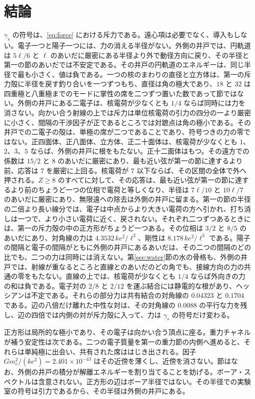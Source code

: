 \documentclass[a4paper]{article}
\begin{document}
\section{結論}

\(\gamma_s\) の符号は、\eqref{eq:force} における斥力である。遠心項は必要でなく、導入もしない。電子一つと陽子一つには、力の消える半径がない。外側の井戸では、円軌道は \(5\ell/6\) と \(\ell\) のあいだに厳密にある半径より外で動径方向に戻り、その半径と第一の節のあいだでは不安定である。その井戸の円軌道のエネルギーは、同じ半径で最も小さく、値は負である。一つの核のまわりの直径と立方体は、第一の斥力殻に半径を戻す釣り合いを一つずつもち、直径は角の極大であり、\(18\) と \(32\) は四重極と八重極までのモードに掌性の席を二つずつ置いた数であって節ではない。外側の井戸にある二電子は、核電荷が少なくとも \(1/4\) ならば同時には力を消さない。向かい合う射線の上では斥力は単位核電荷の引力の四分の一より厳密に小さく、間隔の干渉因子が正であるところでは対蹠点は角の極小である。その井戸での二電子の殻は、単極の席が二つであることであり、符号つきの力の零ではない。正四面体、正八面体、立方体、正二十面体は、核電荷が少なくとも \(1\)、\(2\)、\(3\)、\(5\) ならば、外側の井戸に根をもたない。正十二面体はもつ。その遠方での係数は \(15/2\) と \(8\) のあいだに厳密にあり、最も近い弦が第一の節に達するより前、応答は \(7\) を厳密に上回る。核電荷が \(7\) 以下ならば、その区間の全体で外へ押される。\(Z\ge 8\) のすべてに対して、その応答は、最も近い弦が第一の節に達するより前のちょうど一つの位相で電荷と等しくなり、半径は \(7\ell/10\) と \(10\ell/7\) のあいだに厳密にあり、無限遠への除去は外側の井戸に留まる。第一の節の半径の二倍より長い線分では、電子は中点からより大きい電荷の方へ引かれ、打ち消しは一つで、より小さい電荷に近く、戻されない。それぞれ二つずつあるときには、第一の斥力殻の中の正方形がちょうど一つある。その位相は \(3/2\) と \(8/5\) のあいだにあり、対角線の力は \(4.3532\,k e^{2}/\ell^{2}\)、剛性は \(8.178\,k e^{2}/\ell^{3}\) である。陽子の間隔と電子の間隔がともに外側の井戸にあるあいだは、その二つの間隔のどの比でも、二つの力は同時には消えない。第\ref{sec:water}節の水の骨格も、外側の井戸では、射線が重なるところと直線とのあいだのどの角でも、接線方向の力の共通の零をもたない。直線の上では、核電荷が少なくとも \(1/4\) ならば外向きの力の和は負である。電子対の \(2/8\) と \(2/12\) を運ぶ結合には静電的な根があり、ヘッシアンは不定である。それらの部分力は共有結合の対角線の \(0.04323\) と \(0.1704\) である。辺の八倍だけ離れた中性な対は、その対角線の \(0.0088\) の平行な力を残し、辺の四倍では内側の対が斥力殻に入って、力は \(\gamma_s\) の符号だけ変わる。

正方形は局所的な極小であり、その電子は向かい合う頂点に座る。重力チャネルが補う安定性は次である。二つの電子質量を第一の重力節の内側へ進めると、それらは単純極に出会い、共有された席ははじき出される。因子 \(G m_e^{2}/(k e^{2})=2.401\times 10^{-43}\) はその近傍を薄くし、近傍を消さない。節はなお、外側の井戸の積分が解離エネルギーを割り当てることを妨げる。ボーア・スペクトルは含意されない。正方形の辺はボーア半径ではない。その半径での実験室の符号は引力であるから、その半径は外側の井戸にある。
\end{document}
